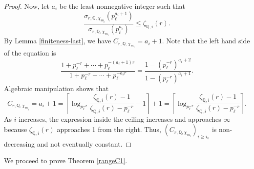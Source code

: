 \documentclass[12pt]{amsart}
\theoremstyle{definition}
\numberwithin{equation}{section}
\newcommand{\Q}{\mathbb{Q}}
\begin{document}
\begin{proof}
    Now, let $a_i$ be the least nonnegative integer such that \begin{equation} \label{eq1}
        \frac{ \sigma_{r,\Q,\chi_{m_i}} (p_{\ell}^{a_i+1}) }{ \sigma_{r,\Q,\chi_{m_i}} (p_{\ell}^{a_i}) } \leq \zeta_{\Q,i}(r).
    \end{equation} By Lemma \ref{finiteness-last}, we have $C_{r,\Q,\chi_{m_i}} = a_i+1.$
    Note that the left hand side of the equation is $$\frac{ 1+p_{\ell}^{-r} + \cdots + p_{\ell}^{-(a_i+1)r} }{  1+p_{\ell}^{-r} + \cdots + p_{\ell}^{-a_i r}  } = \frac{1 - (p_{\ell}^{-r})^{a_i+2}}{1 - (p_{\ell}^{-r})^{a_i+1}}.$$ Algebraic manipulation shows that $$C_{r,\Q,\chi_{m_i}} = a_i +1 = \left\lceil \log_{p_\ell^{-r}} \frac{\zeta_{\Q,i}(r) - 1}{\zeta_{\Q,i}(r) - p_\ell^{-r}} -1 \right\rceil+1 = \left\lceil \log_{p_\ell^{-r}} \frac{\zeta_{\Q,i}(r) - 1}{\zeta_{\Q,i}(r) - p_\ell^{-r}} \right\rceil.$$ As $i$ increases, the expression inside the ceiling increases and approaches $\infty$ because $\zeta_{\Q,i}(r)$ approaches 1 from the right. Thus, $(C_{r,\Q,\chi_{m_i}})_{i \geq i_0}$ is non-decreasing and not eventually constant.
\end{proof}







We proceed to prove Theorem \ref{rangeC1}. 
\end{document}

